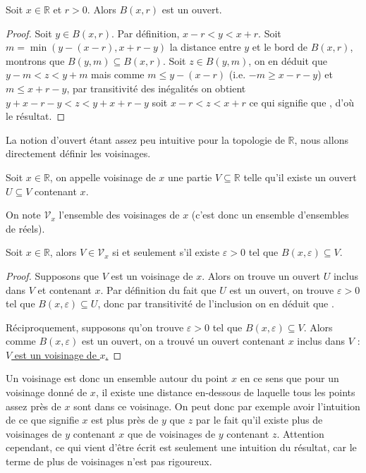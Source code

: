 \begin{prop}
    Soit $x\in\mathbb R$ et $r> 0$. Alors $B(x,r)$ est un ouvert.
\end{prop}

\begin{proof}
    Soit $y\in B(x,r)$. Par définition, $x-r < y < x+r$. Soit $m = \min(y-(x-r),x+r-y)$ la distance entre $y$ et le bord de $B(x,r)$, montrons que $B(y,m)\subseteq B(x,r)$. Soit $z\in B(y,m)$, on en déduit que $y-m < z < y+m$ mais comme $m \leq y-(x-r)$ (i.e. $-m \geq x-r-y$) et $m \leq x+r-y$, par transitivité des inégalités on obtient $y+x-r-y < z < y+x+r-y$ soit \underline{$x-r < z < x+r$} ce qui signifie que , d'où le résultat.
\end{proof}

La notion d'ouvert étant assez peu intuitive pour la topologie de $\mathbb R$, nous allons directement définir les voisinages.

\begin{defi}[Voisinage]
    Soit $x\in \mathbb R$, on appelle voisinage de $x$ une partie $V\subseteq\mathbb R$ telle qu'il existe un ouvert $U\subseteq V$ contenant $x$.

    On note $\mathcal V_x$ l'ensemble des voisinages de $x$ (c'est donc un ensemble d'ensembles de réels).
\end{defi}

\begin{prop}
    Soit $x\in \mathbb R$, alors $V\in\mathcal V_x$ si et seulement s'il existe $\varepsilon > 0$ tel que $B(x,\varepsilon)\subseteq V$.
\end{prop}

\begin{proof}
    Supposons que $V$ est un voisinage de $x$. Alors on trouve un ouvert $U$ inclus dans $V$ et contenant $x$. Par définition du fait que $U$ est un ouvert, on trouve $\varepsilon > 0$ tel que $B(x,\varepsilon)\subseteq U$, donc par transitivité de l'inclusion on en déduit que .

    Réciproquement, supposons qu'on trouve $\varepsilon > 0$ tel que $B(x,\varepsilon)\subseteq V$. Alors comme $B(x,\varepsilon)$ est un ouvert, on a trouvé un ouvert contenant $x$ inclus dans $V$ : \underline{$V$ est un voisinage de $x$.}
\end{proof}

Un voisinage est donc un ensemble \og autour du point $x$\fg{} en ce sens que pour un voisinage donné de $x$, il existe une distance en-dessous de laquelle tous les points assez près de $x$ sont dans ce voisinage. On peut donc par exemple avoir l'intuition de ce que signifie \og $x$ est plus près de $y$ que $z$\fg{} par le fait qu'il existe plus de voisinages de $y$ contenant $x$ que de voisinages de $y$ contenant $z$. Attention cependant, ce qui vient d'être écrit est seulement une intuition du résultat, car le terme de \og plus de voisinages\fg{} n'est pas rigoureux.

